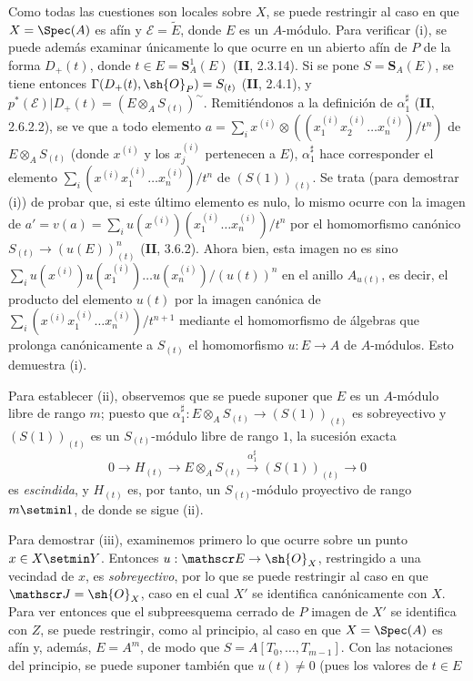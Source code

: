 Como todas las cuestiones son locales sobre $X$, se puede restringir al caso en que $X=\Spec(A)$ es afín y $\mathscr E=\widetilde E$, donde $E$ es un $A$-módulo. Para verificar (i), se puede además examinar únicamente lo que ocurre en un abierto afín de $P$ de la forma $D_+(t)$, donde $t\in E=\mathbf S_A^1(E)$ (\textbf{II}, 2.3.14). Si se pone $S=\mathbf S_A(E)$, se tiene entonces $\Gamma(D_+(t),\sh{O}_P)=S_{(t)}$ (\textbf{II}, 2.4.1), y $p^*(\mathscr E)|D_+(t)=(E\otimes_A S_{(t)})^\sim$. Remitiéndonos a la definición de $\alpha_1^{\sharp}$ (\textbf{II}, 2.6.2.2), se ve que a todo elemento
$a=\sum_i x^{(i)}\otimes((x_1^{(i)}x_2^{(i)}\ldots x_n^{(i)})/t^n)$
de $E\otimes_A S_{(t)}$ (donde $x^{(i)}$ y los $x_j^{(i)}$ pertenecen a $E$), $\alpha_1^{\sharp}$ hace corresponder el elemento
$\sum_i(x^{(i)}x_1^{(i)}\ldots x_n^{(i)})/t^n$
de $(S(1))_{(t)}$. Se trata (para demostrar (i)) de probar que, si este último elemento es nulo, lo mismo ocurre con la imagen de
$a'=v(a)=\sum_i u(x^{(i)})(x_1^{(i)}\ldots x_n^{(i)})/t^n$
por el homomorfismo canónico $S_{(t)}\to(u(E))^n_{(t)}$ (\textbf{II}, 3.6.2). Ahora bien, esta imagen no es sino
$\sum_i u(x^{(i)})u(x_1^{(i)})\ldots u(x_n^{(i)})/(u(t))^n$
en el anillo $A_{u(t)}$, es decir, el producto del elemento $u(t)$ por la imagen canónica de $\sum_i(x^{(i)}x_1^{(i)}\ldots x_n^{(i)})/t^{n+1}$ mediante el homomorfismo de álgebras que prolonga canónicamente a $S_{(t)}$ el homomorfismo $u:E\to A$ de $A$-módulos. Esto demuestra (i).

Para establecer (ii), observemos que se puede suponer que $E$ es un $A$-módulo libre de rango $m$; puesto que $\alpha_1^{\sharp}:E\otimes_A S_{(t)}\to(S(1))_{(t)}$ es sobreyectivo y $(S(1))_{(t)}$ es un $S_{(t)}$-módulo libre de rango $1$, la sucesión exacta
\[
  0\longrightarrow H_{(t)}\longrightarrow E\otimes_A S_{(t)}\xrightarrow{\alpha_1^{\sharp}}(S(1))_{(t)}\longrightarrow0
\]
es \emph{escindida}, y $H_{(t)}$ es, por tanto, un $S_{(t)}$-módulo proyectivo de rango $m\setmin 1$, de donde se sigue (ii).

Para demostrar (iii), examinemos primero lo que ocurre sobre un punto $x\in X\setmin Y$. Entonces $u:\mathscr E\to\sh{O}_X$, restringido a una vecindad de $x$, es \emph{sobreyectivo}, por lo que se puede restringir al caso en que $\mathscr J=\sh{O}_X$, caso en el cual $X'$ se identifica canónicamente con $X$. Para ver entonces que el subpreesquema cerrado de $P$ imagen de $X'$ se identifica con $Z$, se puede restringir, como al principio, al caso en que $X=\Spec(A)$ es afín y, además, $E=A^m$, de modo que $S=A[T_0,\ldots,T_{m-1}]$. Con las notaciones del principio, se puede suponer también que $u(t)\ne0$ (pues los valores de $t\in E$

